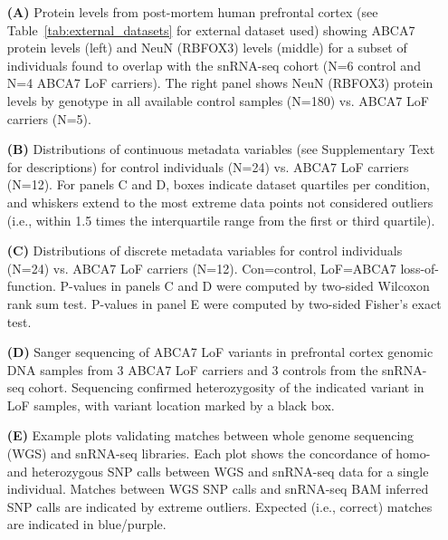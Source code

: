 \begin{itemize}
    \item[\textbf{(A)}] Protein levels from post-mortem human prefrontal cortex (see Table~\ref{tab:external_datasets} for external dataset used) showing ABCA7 protein levels (left) and NeuN (RBFOX3) levels (middle) for a subset of individuals found to overlap with the snRNA-seq cohort (N=6 control and N=4 ABCA7 LoF carriers). The right panel shows NeuN (RBFOX3) protein levels by genotype in all available control samples (N=180) vs. ABCA7 LoF carriers (N=5).
    \item[\textbf{(B)}] Distributions of continuous metadata variables (see Supplementary Text for descriptions) for control individuals (N=24) vs. ABCA7 LoF carriers (N=12). For panels C and D, boxes indicate dataset quartiles per condition, and whiskers extend to the most extreme data points not considered outliers (i.e., within 1.5 times the interquartile range from the first or third quartile). 
    \item[\textbf{(C)}] Distributions of discrete metadata variables for control individuals (N=24) vs. ABCA7 LoF carriers (N=12). Con=control, LoF=ABCA7 loss-of-function. P-values in panels C and D were computed by two-sided Wilcoxon rank sum test. P-values in panel E were computed by two-sided Fisher’s exact test.
    \item[\textbf{(D)}] Sanger sequencing of ABCA7 LoF variants in prefrontal cortex genomic DNA samples from 3 ABCA7 LoF carriers and 3 controls from the snRNA-seq cohort. Sequencing confirmed heterozygosity of the indicated variant in LoF samples, with variant location marked by a black box. 
    \item[\textbf{(E)}] Example plots validating matches between whole genome sequencing (WGS) and snRNA-seq libraries. Each plot shows the concordance of homo- and heterozygous SNP calls between WGS and snRNA-seq data for a single individual. Matches between WGS SNP calls and snRNA-seq BAM inferred SNP calls are indicated by extreme outliers. Expected (i.e., correct) matches are indicated in blue/purple. 
\end{itemize}